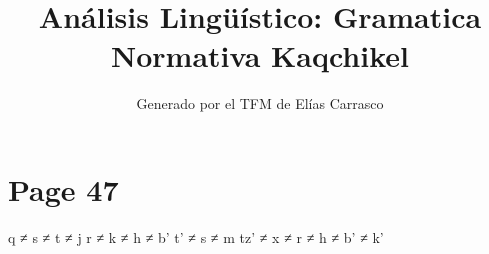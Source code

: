 \documentclass{article}%
\title{Análisis Lingüístico: Gramatica Normativa Kaqchikel}%
\author{Generado por el TFM de Elías Carrasco}%
\begin{document}
%
\normalsize%
\maketitle%
\section{Page 47}%
\label{sec:Page47}%
q ≠ s ≠ t ≠ j %
r ≠ k ≠ h ≠ b’ %
t’ ≠ s ≠ m %
tz’ ≠ x ≠ r ≠ h ≠ b’ ≠ k’ 

%
\end{document}
